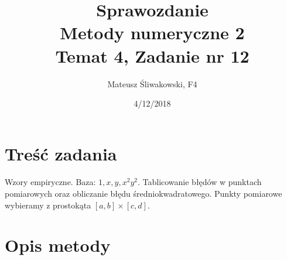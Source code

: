 \documentclass{article}
\title{Sprawozdanie \\Metody numeryczne 2 \\\textbf{Temat 4, Zadanie nr 12}}
\date{4/12/2018}
\author{Mateusz Śliwakowski, F4}
\begin{document}
  \maketitle
 	  \newpage

\section{Treść zadania}
\paragraph{}
Wzory empiryczne. Baza: $1,x,y,x^2y^2$. Tablicowanie błędów w punktach pomiarowych oraz obliczanie błędu średniokwadratowego. Punkty pomiarowe wybieramy z prostokąta $[a,b]\times[c,d]$.
\section{Opis metody}
\end{document}
